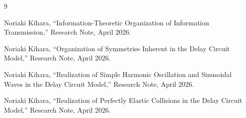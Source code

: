 \documentclass[12pt,a4paper]{article}
\begin{document}
\begin{thebibliography}{9}

Noriaki Kihara,
``Information-Theoretic Organization of Information Transmission,''
Research Note, April 2026.

Noriaki Kihara,
``Organization of Symmetries Inherent in the Delay Circuit Model,''
Research Note, April 2026.

Noriaki Kihara,
``Realization of Simple Harmonic Oscillation and Sinusoidal Waves in the Delay Circuit Model,''
Research Note, April 2026.

Noriaki Kihara,
``Realization of Perfectly Elastic Collisions in the Delay Circuit Model,''
Research Note, April 2026.

\end{thebibliography}
\end{document}
